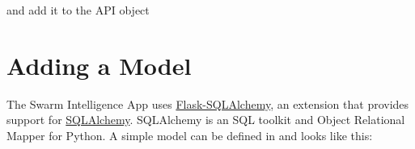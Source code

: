 \documentclass[letterpaper,10pt,english]{sphinxmanual}
\begin{document}
and add it to the API object

\begin{sphinxVerbatim}[commandchars=\\\{\}]
 
     
\end{sphinxVerbatim}


\section{Adding a Model}
\label{\detokenize{developers:adding-a-model}}
The Swarm Intelligence App uses \href{http://flask-sqlalchemy.pocoo.org/2.1/}{Flask-SQLAlchemy}, an extension that provides support for \href{http://www.sqlalchemy.org/}{SQLAlchemy}. SQLAlchemy is an SQL toolkit and Object Relational Mapper for Python. A simple model can be defined in  and looks like this:
\end{document}
